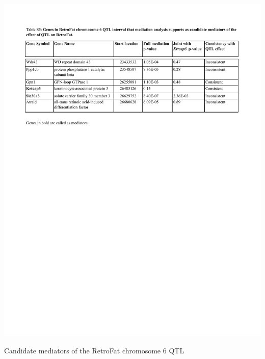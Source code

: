 \begin{table}
\centering
\includegraphics[page=1, trim={0in 7in 0in 1.2in}, clip, width=\textwidth]{figures/5-hsrats/supp_table_mediators.pdf}
\caption{Candidate mediators of the RetroFat chromosome 6 QTL \label{tab:retrofat_chr6_candidate_mediators}}
\end{table}

